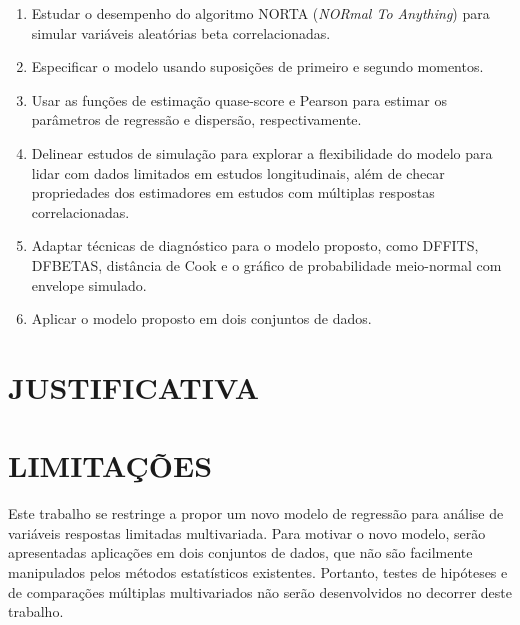 \begin{enumerate}
\item Estudar o desempenho do algoritmo NORTA (\emph{NORmal To
    Anything}) para simular variáveis aleatórias beta correlacionadas.

\item Especificar o modelo usando suposições de primeiro e segundo
  momentos.

\item Usar as funções de estimação quase-score e Pearson para estimar os
  parâmetros de regressão e dispersão, respectivamente.

\item Delinear estudos de simulação para explorar a flexibilidade do
  modelo para lidar com dados limitados em estudos longitudinais, além
  de checar propriedades dos estimadores em estudos com múltiplas
  respostas correlacionadas.

\item Adaptar técnicas de diagnóstico para o modelo proposto, como
  DFFITS, DFBETAS, distância de Cook e o gráfico de probabilidade
  meio-normal com envelope simulado.

\item Aplicar o modelo proposto em dois conjuntos de dados.
\end{enumerate}

  \section{JUSTIFICATIVA}

\section{LIMITAÇÕES}

Este trabalho se restringe a propor um novo modelo de regressão para
análise de variáveis respostas limitadas multivariada. Para motivar o
novo modelo, serão apresentadas aplicações em dois conjuntos de dados,
que não são facilmente manipulados pelos métodos estatísticos
existentes. Portanto, testes de hipóteses e de comparações múltiplas
multivariados não serão desenvolvidos no decorrer deste trabalho.


